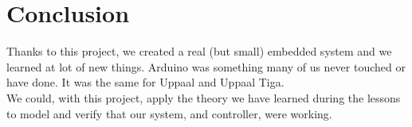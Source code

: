 \section{Conclusion}
Thanks to this project, we created a real (but small) embedded system and we learned at lot of new things. Arduino was something many of us never touched or have done. It was the same for Uppaal and Uppaal Tiga. \\
We could, with this project, apply the theory we have learned during the lessons to model and verify that our system, and controller, were working.
